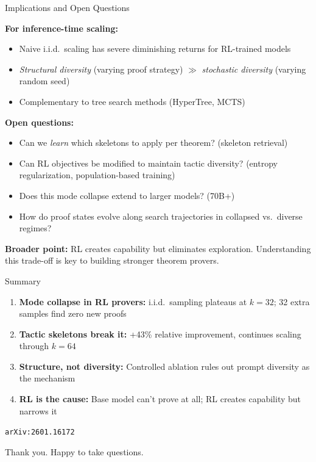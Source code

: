 \documentclass[aspectratio=169]{beamer}
\begin{document}
\begin{frame}{Implications and Open Questions}

\textbf{For inference-time scaling:}
\begin{itemize}
    \item Naive i.i.d.\ scaling has severe diminishing returns for RL-trained models
    \item \emph{Structural diversity} (varying proof strategy) $\gg$ \emph{stochastic diversity} (varying random seed)
    \item Complementary to tree search methods (HyperTree, MCTS)
\end{itemize}

\vspace{0.5em}
\textbf{Open questions:}
\begin{itemize}
    \item Can we \emph{learn} which skeletons to apply per theorem? (skeleton retrieval)
    \item Can RL objectives be modified to maintain tactic diversity? (entropy regularization, population-based training)
    \item Does this mode collapse extend to larger models? (70B+)
    \item How do proof states evolve along search trajectories in collapsed vs.\ diverse regimes?
\end{itemize}

\vspace{0.5em}
\textbf{Broader point:} RL creates capability but eliminates exploration. Understanding this trade-off is key to building stronger theorem provers.
\end{frame}

\begin{frame}{Summary}

\begin{enumerate}
    \item \textbf{Mode collapse in RL provers:} i.i.d.\ sampling plateaus at $k{=}32$; 32 extra samples find zero new proofs
    \item \textbf{Tactic skeletons break it:} +43\% relative improvement, continues scaling through $k{=}64$
    \item \textbf{Structure, not diversity:} Controlled ablation rules out prompt diversity as the mechanism
    \item \textbf{RL is the cause:} Base model can't prove at all; RL creates capability but narrows it
\end{enumerate}

\vspace{1em}
\centering
\texttt{arXiv:2601.16172}

\vspace{0.5em}
{\small Thank you. Happy to take questions.}
\end{frame}
\end{document}
